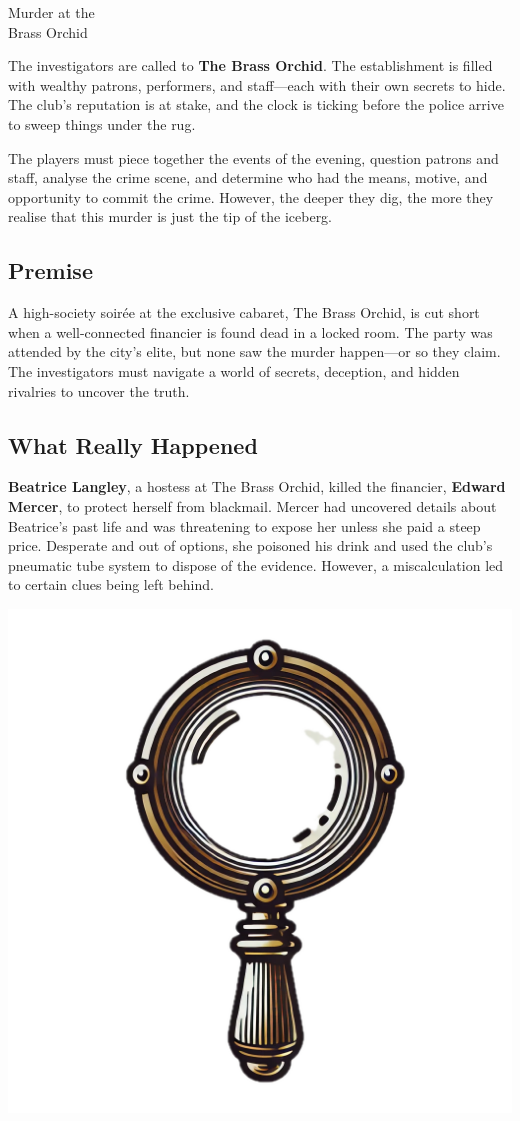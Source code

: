 
\begin{WyrdScenarioHeading}{Murder at the\\Brass Orchid}
	\raggedright
	
	The investigators are called to \textbf{The Brass Orchid}. The establishment is filled with wealthy patrons, performers, and staff—each with their own secrets to hide. The club’s reputation is at stake, and the clock is ticking before the police arrive to sweep things under the rug.

	The players must piece together the events of the evening, question patrons and staff, analyse the crime scene, and determine who had the means, motive, and opportunity to commit the crime. However, the deeper they dig, the more they realise that this murder is just the tip of the iceberg.

	\subsection*{Premise} 
	A high-society soirée at the exclusive cabaret, The Brass Orchid, is cut short when a well-connected financier is found dead in a locked room. The party was attended by the city's elite, but none saw the murder happen—or so they claim. The investigators must navigate a world of secrets, deception, and hidden rivalries to uncover the truth.

	\subsection*{What Really Happened} 
	\textbf{Beatrice Langley}, a hostess at The Brass Orchid, killed the financier, \textbf{Edward Mercer}, to protect herself from blackmail. Mercer had uncovered details about Beatrice’s past life and was threatening to expose her unless she paid a steep price. Desperate and out of options, she poisoned his drink and used the club’s pneumatic tube system to dispose of the evidence. However, a miscalculation led to certain clues being left behind.
\end{WyrdScenarioHeading}

\begin{center}
	\includegraphics[width=.5\linewidth]{img/separt/detective-glass}
\end{center}


